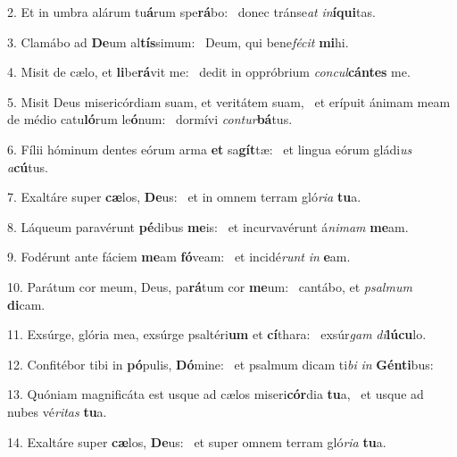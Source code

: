 2. Et in umbra alárum tu\textbf{á}rum spe\textbf{rá}bo: \ast\  donec tránse\textit{at} \textit{in}\textbf{í}\textbf{qui}tas.\

3. Clamábo ad \textbf{De}um al\textbf{tís}simum: \ast\  Deum, qui bene\textit{fé}\textit{cit} \textbf{mi}hi.\

4. Misit de cælo, et \textbf{li}be\textbf{rá}vit me: \ast\  dedit in oppróbrium \textit{con}\textit{cul}\textbf{cán}\textbf{tes} me.\

5. Misit Deus misericórdiam suam, et veritátem suam, \dag\  et erípuit ánimam meam de médio catu\textbf{ló}rum le\textbf{ó}num: \ast\  dormívi \textit{con}\textit{tur}\textbf{bá}tus.\

6. Fílii hóminum dentes eórum arma \textbf{et} sa\textbf{gít}tæ: \ast\  et lingua eórum gládi\textit{us} \textit{a}\textbf{cú}tus.\

7. Exaltáre super \textbf{cæ}los, \textbf{De}us: \ast\  et in omnem terram gló\textit{ri}\textit{a} \textbf{tu}a.\

8. Láqueum paravérunt \textbf{pé}dibus \textbf{me}is: \ast\  et incurvavérunt á\textit{ni}\textit{mam} \textbf{me}am.\

9. Fodérunt ante fáciem \textbf{me}am \textbf{fó}veam: \ast\  et incidé\textit{runt} \textit{in} \textbf{e}am.\

10. Parátum cor meum, Deus, pa\textbf{rá}tum cor \textbf{me}um: \ast\  cantábo, et \textit{psal}\textit{mum} \textbf{di}cam.\

11. Exsúrge, glória mea, exsúrge psaltéri\textbf{um} et \textbf{cí}thara: \ast\  exsúr\textit{gam} \textit{di}\textbf{lú}\textbf{cu}lo.\

12. Confitébor tibi in \textbf{pó}pulis, \textbf{Dó}mine: \ast\  et psalmum dicam ti\textit{bi} \textit{in} \textbf{Gén}\textbf{ti}bus:\

13. Quóniam magnificáta est usque ad cælos miseri\textbf{cór}dia \textbf{tu}a, \ast\  et usque ad nubes vé\textit{ri}\textit{tas} \textbf{tu}a.\

14. Exaltáre super \textbf{cæ}los, \textbf{De}us: \ast\  et super omnem terram gló\textit{ri}\textit{a} \textbf{tu}a.\

